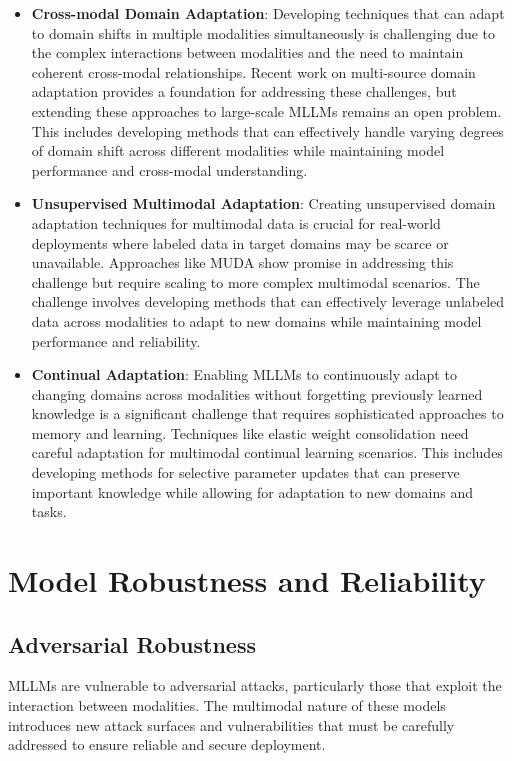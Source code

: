 \begin{itemize}
    \item \textbf{Cross-modal Domain Adaptation}: Developing techniques that can adapt to domain shifts in multiple modalities simultaneously is challenging due to the complex interactions between modalities and the need to maintain coherent cross-modal relationships. Recent work on multi-source domain adaptation \citep{peng2019moment} provides a foundation for addressing these challenges, but extending these approaches to large-scale MLLMs remains an open problem. This includes developing methods that can effectively handle varying degrees of domain shift across different modalities while maintaining model performance and cross-modal understanding.
    
    \item \textbf{Unsupervised Multimodal Adaptation}: Creating unsupervised domain adaptation techniques for multimodal data is crucial for real-world deployments where labeled data in target domains may be scarce or unavailable. Approaches like MUDA \citep{yang2020muda} show promise in addressing this challenge but require scaling to more complex multimodal scenarios. The challenge involves developing methods that can effectively leverage unlabeled data across modalities to adapt to new domains while maintaining model performance and reliability.
    
    \item \textbf{Continual Adaptation}: Enabling MLLMs to continuously adapt to changing domains across modalities without forgetting previously learned knowledge is a significant challenge that requires sophisticated approaches to memory and learning. Techniques like elastic weight consolidation \citep{kirkpatrick2017overcoming} need careful adaptation for multimodal continual learning scenarios. This includes developing methods for selective parameter updates that can preserve important knowledge while allowing for adaptation to new domains and tasks.
\end{itemize}

\section{Model Robustness and Reliability}

\subsection{Adversarial Robustness}
MLLMs are vulnerable to adversarial attacks, particularly those that exploit the interaction between modalities. The multimodal nature of these models introduces new attack surfaces and vulnerabilities that must be carefully addressed to ensure reliable and secure deployment.

